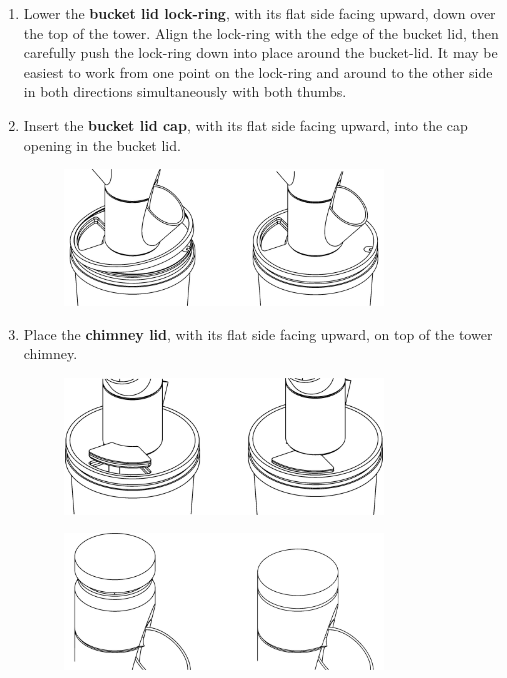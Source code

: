 \begin{enumerate}
\item Lower the \textbf{bucket lid lock-ring}, with its flat side facing upward, down over the top of the tower. Align the lock-ring with the edge of the bucket lid, then carefully push the lock-ring down into place around the bucket-lid. It may be easiest to work from one point on the lock-ring and around to the other side in both directions simultaneously with both thumbs.

\item Insert the \textbf{bucket lid cap}, with its flat side facing upward, into the cap opening in the bucket lid.

\begin{figure}[h]
    \centering
    \includegraphics[width=0.8\textwidth]{images/80mm/80mm_assembly_9.png}
    \caption*{}
    \label{fig:80mm-nine}
\end{figure}

\item Place the \textbf{chimney lid}, with its flat side facing upward, on top of the tower chimney.

\begin{figure}[h]
    \centering
    \includegraphics[width=0.8\textwidth]{images/80mm/80mm_assembly_10.png}
    \caption*{}
    \label{fig:80mm-ten}
\end{figure}
\begin{figure}[h]
    \centering
    \includegraphics[width=0.8\textwidth]{images/80mm/80mm_assembly_11.png}
    \caption*{}
    \label{fig:80mm-eleven}
\end{figure}

\end{enumerate}

\setlength{\intextsep}{12.0pt plus 2.0pt minus 2.0pt}
\setlength{\floatsep}{12.0pt plus 2.0pt minus 2.0pt}
\setlength{\textfloatsep}{20.0pt plus 2.0pt minus 4.0pt}
\setlength{\belowcaptionskip}{0.0pt}
